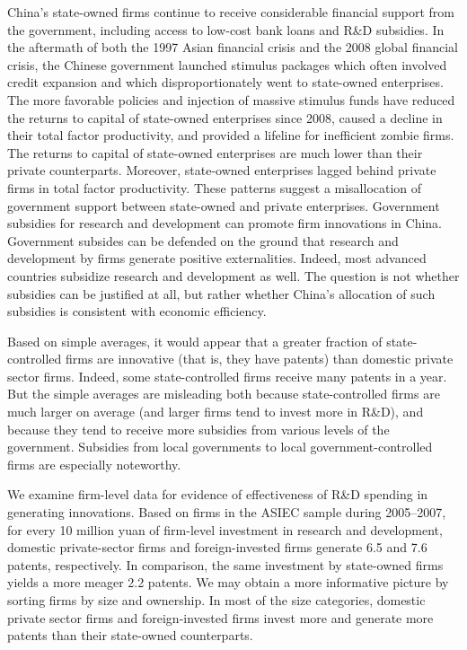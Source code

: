 \documentclass{article}
\begin{document}
    China’s state-owned firms continue to receive considerable financial support from the government, including access to low-cost bank loans and R\&D subsidies. In the aftermath of both the 1997 Asian financial crisis and the 2008 global financial crisis, the Chinese government launched stimulus packages which often involved credit expansion and which disproportionately went to state-owned enterprises. The more favorable policies and injection of massive stimulus funds have reduced the returns to capital of state-owned enterprises since 2008, caused a decline in their total factor productivity, and provided a lifeline for inefficient zombie firms. The returns to capital of state-owned enterprises are much lower than their private counterparts. Moreover, state-owned enterprises lagged behind private firms in total factor productivity. These patterns suggest a misallocation of government support between state-owned and private enterprises. Government subsidies for research and development can promote firm innovations in China. Government subsides can be defended on the ground that research and development by firms generate positive externalities. Indeed, most advanced countries subsidize research and development as well. The question is not whether subsidies can be justified at all, but rather whether China’s allocation of such subsidies is consistent with economic efficiency.

    Based on simple averages, it would appear that a greater fraction of state-controlled firms are innovative (that is, they have patents) than domestic private sector firms. Indeed, some state-controlled firms receive many patents in a year. But the simple averages are misleading both because state-controlled firms are much larger on average (and larger firms tend to invest more in R\&D), and because they tend to receive more subsidies from various levels of the government. Subsidies from local governments to local government-controlled firms are especially noteworthy.

    We examine firm-level data for evidence of effectiveness of R\&D spending in generating innovations. Based on firms in the ASIEC sample during 2005–2007, for every 10 million yuan of firm-level investment in research and development, domestic private-sector firms and foreign-invested firms generate 6.5 and 7.6 patents, respectively. In comparison, the same investment by state-owned firms yields a more meager 2.2 patents. We may obtain a more informative picture by sorting firms by size and ownership.  In most of the size categories, domestic private sector firms and foreign-invested firms invest more and generate more patents than their state-owned counterparts.
\end{document}
